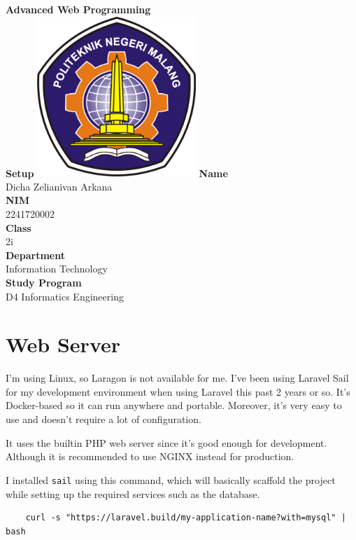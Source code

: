 \documentclass[12pt,titlepage]{article}
\newcommand{\vSubject}{Advanced Web Programming}
\newcommand{\vSubtitle}{Setup}
\newcommand{\vName}{Dicha Zelianivan Arkana}
\newcommand{\vNIM}{2241720002}
\newcommand{\vClass}{2i}
\newcommand{\vDepartment}{Information Technology}
\newcommand{\vStudyProgram}{D4 Informatics Engineering}
\begin{document}
\begin{titlepage}
    \centering
    \vfill
    {\bfseries\LARGE
        \vSubject\\
        \vskip0.25cm
        \vSubtitle
    }
    \vfill
    \includegraphics[width=6cm]{images/polinema-logo.png}
    \vfill
    {
        \textbf{Name}\\
        \vName\\
        \vskip0.5cm
        \textbf{NIM}\\
        \vNIM\\
        \vskip0.5cm
        \textbf{Class}\\
        \vClass\\
        \vskip0.5cm
        \textbf{Department}\\
        \vDepartment\\
        \vskip0.5cm
        \textbf{Study Program}\\
        \vStudyProgram
    }
\end{titlepage}

\section{Web Server}

I'm using Linux, so Laragon is not available for me. I've been using Laravel Sail for my development
environment when using Laravel this past 2 years or so. It's Docker-based so it can run anywhere
and portable. Moreover, it's very easy to use and doesn't require a lot of configuration.

It uses the builtin PHP web server since it's good enough for development.
Although it is recommended to use NGINX instead for production.

I installed \texttt{sail} using this command, which will basically scaffold the project while setting up
the required services such as the database.

\begin{verbatim}
    curl -s "https://laravel.build/my-application-name?with=mysql" | bash
\end{verbatim}
\end{document}
